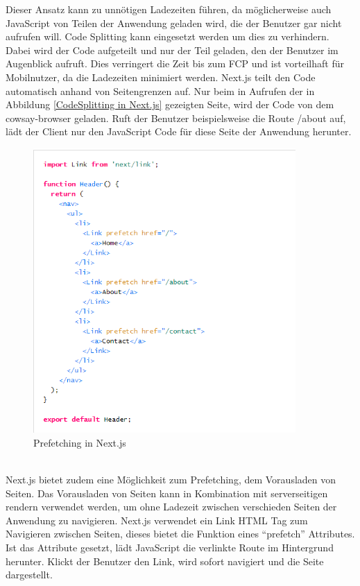 \documentclass[runningheads]{llncs}
\begin{document}
Dieser Ansatz kann zu unnötigen Ladezeiten führen, 
da möglicherweise auch JavaScript von Teilen der Anwendung geladen wird, 
die der Benutzer gar nicht aufrufen will. 
Code Splitting kann eingesetzt werden um dies zu verhindern. 
Dabei wird der Code aufgeteilt und nur der Teil geladen, 
den der Benutzer im Augenblick aufruft. 
Dies verringert die Zeit bis zum FCP und ist vorteilhaft für Mobilnutzer, 
da die Ladezeiten minimiert werden.
Next.js teilt den Code automatisch anhand von Seitengrenzen auf. 
Nur beim in Aufrufen der in Abbildung \ref{CodeSplitting in Next.js} gezeigten Seite,
wird der Code von dem cowsay-browser geladen.
Ruft der Benutzer beispielsweise die Route /about auf, 
lädt der Client nur den JavaScript Code für diese Seite der Anwendung herunter.
\begin{figure}
  \centering
  \includegraphics[width=10cm]{images/prefetchnext}
  \caption{Prefetching in Next.js}
  \label{Prefetching in Next.js}
\end{figure}
\\
Next.js bietet zudem eine Möglichkeit zum Prefetching, 
dem Vorausladen von Seiten. 
Das Vorausladen von Seiten kann in Kombination mit serverseitigen rendern verwendet werden, 
um ohne Ladezeit zwischen verschieden Seiten der Anwendung zu navigieren. 
Next.js verwendet ein Link HTML Tag zum Navigieren zwischen Seiten, 
dieses bietet die Funktion eines “prefetch” Attributes. 
Ist das Attribute gesetzt, 
lädt JavaScript die verlinkte Route im Hintergrund herunter. 
Klickt der Benutzer den Link, 
wird sofort navigiert und die Seite dargestellt. 
\end{document}
